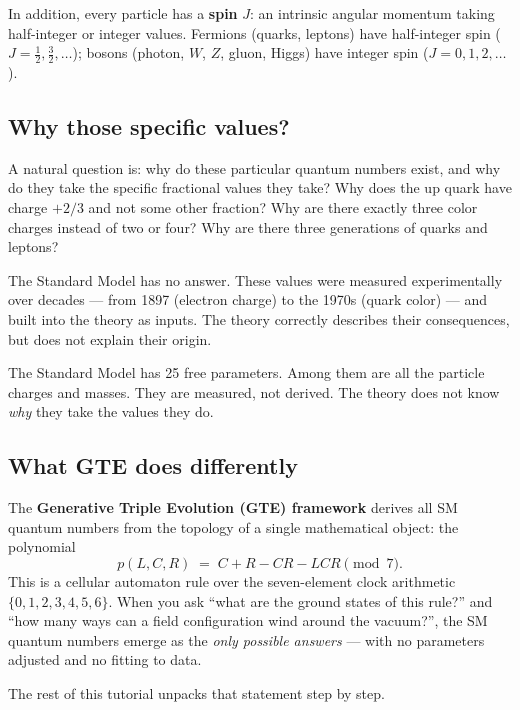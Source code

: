 \documentclass[11pt,a4paper]{article}
\newcommand{\term}[1]{\textbf{#1}}
\begin{document}
\noindent
In addition, every particle has a \term{spin} $J$: an intrinsic angular
momentum taking half-integer or integer values.
Fermions (quarks, leptons) have half-integer spin ($J = \tfrac12, \tfrac32,
\ldots$); bosons (photon, $W$, $Z$, gluon, Higgs) have integer spin
($J = 0, 1, 2, \ldots$).

\subsection{Why those specific values?}

A natural question is: why do these particular quantum numbers exist, and
why do they take the specific fractional values they take?  Why does the
up quark have charge $+2/3$ and not some other fraction?  Why are there
exactly three color charges instead of two or four?  Why are there three
generations of quarks and leptons?

The Standard Model has no answer.  These values were measured experimentally
over decades --- from 1897 (electron charge) to the 1970s (quark color) ---
and built into the theory as inputs.  The theory correctly describes their
consequences, but does not explain their origin.

\begin{tcolorbox}[colback=boxorange,colframe=orange!60!black,title=The mystery]
The Standard Model has 25 free parameters.  Among them are all the particle
charges and masses.  They are measured, not derived.  The theory does not
know \emph{why} they take the values they do.
\end{tcolorbox}

\subsection{What GTE does differently}

The \term{Generative Triple Evolution (GTE) framework} derives all SM quantum
numbers from the topology of a single mathematical object: the polynomial
\[
  p(L,C,R) \;=\; C + R - CR - LCR \pmod{7}.
\]
This is a cellular automaton rule over the seven-element clock arithmetic
$\{0,1,2,3,4,5,6\}$.  When you ask ``what are the ground states of this
rule?'' and ``how many ways can a field configuration wind around the
vacuum?'', the SM quantum numbers emerge as the \emph{only possible answers}
--- with no parameters adjusted and no fitting to data.

The rest of this tutorial unpacks that statement step by step.
\end{document}
